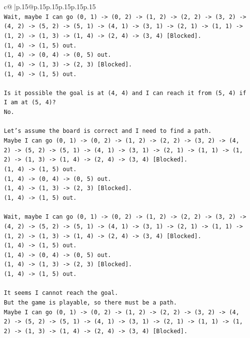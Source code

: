 \documentclass{article}
\begin{document}
{\begin{supertabular}{c@{$\;$}|p{.15\linewidth}@{}p{.15\linewidth}p{.15\linewidth}p{.15\linewidth}p{.15\linewidth}p{.15\linewidth}}
{{{\\ 
\texttt{Wait, maybe I can go (0, 1) {-}> (0, 2) {-}> (1, 2) {-}> (2, 2) {-}> (3, 2) {-}> (4, 2) {-}> (5, 2) {-}> (5, 1) {-}> (4, 1) {-}> (3, 1) {-}> (2, 1) {-}> (1, 1) {-}> (1, 2) {-}> (1, 3) {-}> (1, 4) {-}> (2, 4) {-}> (3, 4) {[}Blocked{]}.} \\
\texttt{(1, 4) {-}> (1, 5) out.} \\
\texttt{(1, 4) {-}> (0, 4) {-}> (0, 5) out.} \\
\texttt{(1, 4) {-}> (1, 3) {-}> (2, 3) {[}Blocked{]}.} \\
\texttt{(1, 4) {-}> (1, 5) out.} \\
\\ 
\texttt{Is it possible the goal is at (4, 4) and I can reach it from (5, 4) if I am at (5, 4)?} \\
\texttt{No.} \\
\\ 
\texttt{Let's assume the board is correct and I need to find a path.} \\
\texttt{Maybe I can go (0, 1) {-}> (0, 2) {-}> (1, 2) {-}> (2, 2) {-}> (3, 2) {-}> (4, 2) {-}> (5, 2) {-}> (5, 1) {-}> (4, 1) {-}> (3, 1) {-}> (2, 1) {-}> (1, 1) {-}> (1, 2) {-}> (1, 3) {-}> (1, 4) {-}> (2, 4) {-}> (3, 4) {[}Blocked{]}.} \\
\texttt{(1, 4) {-}> (1, 5) out.} \\
\texttt{(1, 4) {-}> (0, 4) {-}> (0, 5) out.} \\
\texttt{(1, 4) {-}> (1, 3) {-}> (2, 3) {[}Blocked{]}.} \\
\texttt{(1, 4) {-}> (1, 5) out.} \\
\\ 
\texttt{Wait, maybe I can go (0, 1) {-}> (0, 2) {-}> (1, 2) {-}> (2, 2) {-}> (3, 2) {-}> (4, 2) {-}> (5, 2) {-}> (5, 1) {-}> (4, 1) {-}> (3, 1) {-}> (2, 1) {-}> (1, 1) {-}> (1, 2) {-}> (1, 3) {-}> (1, 4) {-}> (2, 4) {-}> (3, 4) {[}Blocked{]}.} \\
\texttt{(1, 4) {-}> (1, 5) out.} \\
\texttt{(1, 4) {-}> (0, 4) {-}> (0, 5) out.} \\
\texttt{(1, 4) {-}> (1, 3) {-}> (2, 3) {[}Blocked{]}.} \\
\texttt{(1, 4) {-}> (1, 5) out.} \\
\\ 
\texttt{It seems I cannot reach the goal.} \\
\texttt{But the game is playable, so there must be a path.} \\
\texttt{Maybe I can go (0, 1) {-}> (0, 2) {-}> (1, 2) {-}> (2, 2) {-}> (3, 2) {-}> (4, 2) {-}> (5, 2) {-}> (5, 1) {-}> (4, 1) {-}> (3, 1) {-}> (2, 1) {-}> (1, 1) {-}> (1, 2) {-}> (1, 3) {-}> (1, 4) {-}> (2, 4) {-}> (3, 4) {[}Blocked{]}.} \\
}}}
\end{supertabular}}
\end{document}
